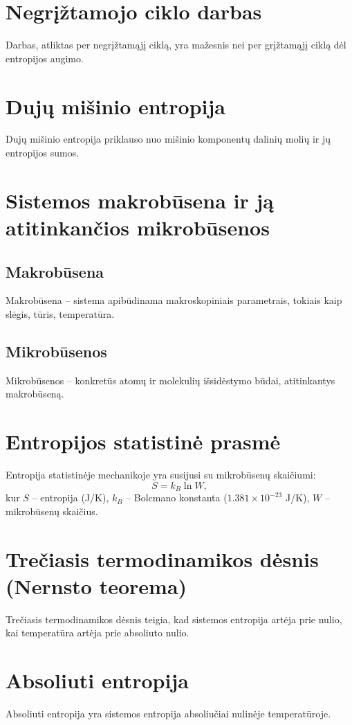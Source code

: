 \documentclass[a4paper,12pt]{article}
\begin{document}
\section{Negrįžtamojo ciklo darbas}
Darbas, atliktas per negrįžtamąjį ciklą, yra mažesnis nei per grįžtamąjį ciklą dėl entropijos augimo.

\section{Dujų mišinio entropija}
Dujų mišinio entropija priklauso nuo mišinio komponentų dalinių molių ir jų entropijos sumos.

\section{Sistemos makrobūsena ir ją atitinkančios mikrobūsenos}

\subsection{Makrobūsena}
Makrobūsena – sistema apibūdinama makroskopiniais parametrais, tokiais kaip slėgis, tūris, temperatūra.

\subsection{Mikrobūsenos}
Mikrobūsenos – konkretūs atomų ir molekulių išsidėstymo būdai, atitinkantys makrobūseną.

\section{Entropijos statistinė prasmė}
Entropija statistinėje mechanikoje yra susijusi su mikrobūsenų skaičiumi:
\[
S = k_B \ln W,
\]
kur $S$ – entropija (J/K), $k_B$ – Bolcmano konstanta ($1.381 \times 10^{-23}$ J/K), $W$ – mikrobūsenų skaičius.

\section{Trečiasis termodinamikos dėsnis (Nernsto teorema)}
Trečiasis termodinamikos dėsnis teigia, kad sistemos entropija artėja prie nulio, kai temperatūra artėja prie absoliuto nulio.

\section{Absoliuti entropija}
Absoliuti entropija yra sistemos entropija absoliučiai nulinėje temperatūroje.
\end{document}
